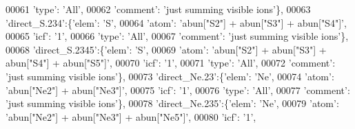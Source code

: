 \begin{DoxyCode}
00061                                        \textcolor{stringliteral}{'type'}: \textcolor{stringliteral}{'All'},
00062                                        \textcolor{stringliteral}{'comment'}: \textcolor{stringliteral}{'just summing visible ions'}\},
00063                          \textcolor{stringliteral}{'direct\_S.234'}:\{\textcolor{stringliteral}{'elem'}: \textcolor{stringliteral}{'S'},
00064                                        \textcolor{stringliteral}{'atom'}: \textcolor{stringliteral}{'abun["S2"] + abun["S3"] + abun["S4"]'},
00065                                        \textcolor{stringliteral}{'icf'}: \textcolor{stringliteral}{'1'},
00066                                        \textcolor{stringliteral}{'type'}: \textcolor{stringliteral}{'All'},
00067                                        \textcolor{stringliteral}{'comment'}: \textcolor{stringliteral}{'just summing visible ions'}\},
00068                          \textcolor{stringliteral}{'direct\_S.2345'}:\{\textcolor{stringliteral}{'elem'}: \textcolor{stringliteral}{'S'},
00069                                        \textcolor{stringliteral}{'atom'}: \textcolor{stringliteral}{'abun["S2"] + abun["S3"] + abun["S4"] + abun["S5"]'},
00070                                        \textcolor{stringliteral}{'icf'}: \textcolor{stringliteral}{'1'},
00071                                        \textcolor{stringliteral}{'type'}: \textcolor{stringliteral}{'All'},
00072                                        \textcolor{stringliteral}{'comment'}: \textcolor{stringliteral}{'just summing visible ions'}\},
00073                          \textcolor{stringliteral}{'direct\_Ne.23'}:\{\textcolor{stringliteral}{'elem'}: \textcolor{stringliteral}{'Ne'},
00074                                        \textcolor{stringliteral}{'atom'}: \textcolor{stringliteral}{'abun["Ne2"] + abun["Ne3"]'},
00075                                        \textcolor{stringliteral}{'icf'}: \textcolor{stringliteral}{'1'},
00076                                        \textcolor{stringliteral}{'type'}: \textcolor{stringliteral}{'All'},
00077                                        \textcolor{stringliteral}{'comment'}: \textcolor{stringliteral}{'just summing visible ions'}\},
00078                          \textcolor{stringliteral}{'direct\_Ne.235'}:\{\textcolor{stringliteral}{'elem'}: \textcolor{stringliteral}{'Ne'},
00079                                        \textcolor{stringliteral}{'atom'}: \textcolor{stringliteral}{'abun["Ne2"] + abun["Ne3"] + abun["Ne5"]'},
00080                                        \textcolor{stringliteral}{'icf'}: \textcolor{stringliteral}{'1'},

\end{DoxyCode}
